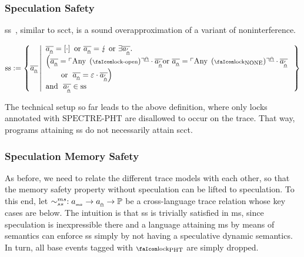 \subsubsection{Speculation Safety}

\gls*{ss}~\cite{patrignani2021exorcising}, similar to \gls*{scct}, is a sound overapproximation of a variant of noninterference.

\begin{definition}{}
  \[
    \sssafe := \left\{
      \specTrace
        \left|
          \begin{array}{l}
            \specTrace=\hole{\cdot} 
              \text{ or } 
            \specTrace=\lightning
              \text{ or }
            \exists\specTrace['].\\
            \left(\specTrace=\specAny[\unlock]\cdot\specTrace['] 
              \text{or }
            \varTrace[_{\mathghost}]=\specAny[\lock_{\text{NONE}}]\cdot\specTrace[']\right.\\
            \hspace{2em}\text{or }
            \left.\varTrace[_{\mathghost}]=\emptyevent\cdot\specTrace[']\right)\\
            \text{and }%
            \ \varTrace[_{\mathghost}']\in\sssafe
          \end{array}
        \right.
      \right\}
  \] 
\end{definition}
The technical setup so far leads to the above definition, where only locks annotated with $\text{SPECTRE-PHT}$ are disallowed to occur on the trace.
That way, programs attaining \gls*{ss} do not necessarily attain \gls*{scct}.

\subsubsection{Speculation Memory Safety}\label{sec:spec-ms-rel}

As before, we need to relate the different trace models with each other, so that the memory safety property without speculation can be lifted to speculation. 
To this end, let $\xlangrel{ms}{ss}: \msEvent \to \specEvent\to\mathbb{P}$ be a cross-language trace relation whose key cases are below.
The intuition is that \gls*{ss} is trivially satisfied in \gls*{ms}, since speculation is inexpressible there and a language attaining \gls*{ms} by means of semantics can enforce \gls*{ss} simply by not having a speculative dynamic semantics. 
In turn, all base events tagged with $\lock_{\text{PHT}}$ are simply dropped. 

